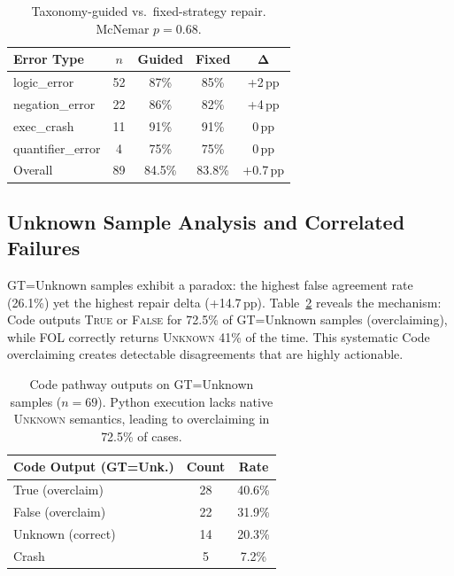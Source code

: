 \documentclass[11pt,a4paper]{article}
\newcommand{\pp}{\,pp}
\begin{document}
\begin{table}[t]
\centering
\small
\begin{tabular}{lcccc}
\toprule
\textbf{Error Type} & $n$ & \textbf{Guided} & \textbf{Fixed} & $\boldsymbol{\Delta}$ \\
\midrule
logic\_error & 52 & 87\% & 85\% & +2\pp{} \\
negation\_error & 22 & 86\% & 82\% & +4\pp{} \\
exec\_crash & 11 & 91\% & 91\% & 0\pp{} \\
quantifier\_error & 4 & 75\% & 75\% & 0\pp{} \\
\midrule
Overall & 89 & 84.5\% & 83.8\% & +0.7\pp{} \\
\bottomrule
\end{tabular}
\caption{Taxonomy-guided vs.\ fixed-strategy repair. McNemar $p{=}0.68$.}
\label{tab:taxonomy-repair}
\end{table}

\subsection{Unknown Sample Analysis and Correlated Failures}
\label{sec:unknown}

GT=Unknown samples exhibit a paradox: the highest false agreement rate (26.1\%) yet the highest repair delta (+14.7\pp{}).
Table~\ref{tab:unknown} reveals the mechanism: Code outputs \textsc{True} or \textsc{False} for 72.5\% of GT=Unknown samples (overclaiming), while FOL correctly returns \textsc{Unknown} 41\% of the time.
This systematic Code overclaiming creates detectable disagreements that are highly actionable.

\begin{table}[t]
\centering
\small
\begin{tabular}{lcc}
\toprule
\textbf{Code Output (GT=Unk.)} & \textbf{Count} & \textbf{Rate} \\
\midrule
True (overclaim) & 28 & 40.6\% \\
False (overclaim) & 22 & 31.9\% \\
Unknown (correct) & 14 & 20.3\% \\
Crash & 5 & 7.2\% \\
\bottomrule
\end{tabular}
\caption{Code pathway outputs on GT=Unknown samples ($n{=}69$). Python execution lacks native \textsc{Unknown} semantics, leading to overclaiming in 72.5\% of cases.}
\label{tab:unknown}
\end{table}
\end{document}
